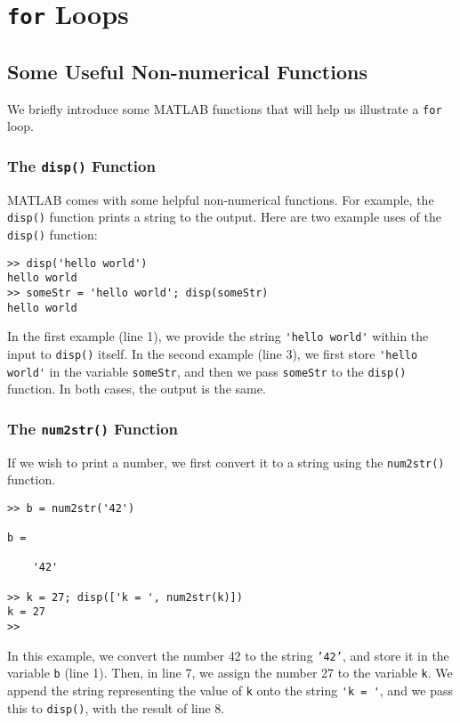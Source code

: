 \section{\texttt{for} Loops}

\subsection{Some Useful Non-numerical Functions}

We briefly introduce some MATLAB functions that will help us illustrate a \texttt{for} loop.

\subsubsection{The \texttt{disp()} Function}
MATLAB comes with some helpful non-numerical functions. For example, the \texttt{disp()} function prints a string to the output. Here are two example uses of the \texttt{disp()} function:
\begin{lstlisting}[style=Matlab-editor]
>> disp('hello world')
hello world
>> someStr = 'hello world'; disp(someStr)
hello world
\end{lstlisting}
In the first example (line 1), we provide the string \verb!'hello world'! within the input to \texttt{disp()} itself. In the second example (line 3), we first store \verb!'hello world'! in the variable \texttt{someStr}, and then we pass \texttt{someStr} to the \texttt{disp()} function. In both cases, the output is the same.

\subsubsection{The \texttt{num2str()} Function}
If we wish to print a number, we first convert it to a string using the \texttt{num2str()} function.
\begin{lstlisting}[style=Matlab-editor]
>> b = num2str('42')

b =

    '42'

>> k = 27; disp(['k = ', num2str(k)])
k = 27
>> 
\end{lstlisting}
In this example, we convert the number 42 to the string \texttt{'42'}, and store it in the variable \texttt{b} (line 1). Then, in line 7, we assign the number 27 to the variable \texttt{k}. We append the string representing the value of \texttt{k} onto the string \verb!'k = '!, and we pass this to \texttt{disp()}, with the result of line 8.

